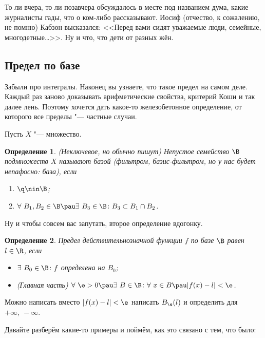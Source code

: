 \documentclass[a4paper,10pt,twoside]{article}
\newtheorem{Def}{Определение}[section]
\begin{document}
 То ли вчера, то ли позавчера обсуждалось в месте под названием дума, какие журналисты гады, что о ком-либо рассказывают. Иосиф (отчество, к сожалению, не помню)
 Кабзон высказался: <<Перед вами сидят уважаемые люди, семейные, многодетные\ldots>>. Ну и что, что дети от разных жён.
 
 \subsection{Предел по базе}
 Забыли про интегралы. Наконец вы узнаете, что такое предел на самом деле. Каждый раз заново доказывать арифметические свойства, критерий Коши и так далее лень.
 Поэтому хочется дать какое-то железобетонное определение, от которого все пределы "--- частные случаи.
 
 Пусть $X$ "--- множество.
 
 \begin{Def}(Неключевое, но обычно пишут)
 	Непустое семейство $\B$ подмножеств $X$ называют базой (фильтром, базис-фильтром, но у нас будет непафосно: база), если
 	\begin{enumerate}
 	  \item $\q\nin \B$;
 	  \item $\forall\  B_1,B_2\in\B\pau \exists\  B_3\in\B\colon B_3\subset B_1\cap B_2$.
 	\end{enumerate}
 \end{Def} 
 
 Ну и чтобы совсем вас запутать, второе определение вдогонку.
 
 \begin{Def}
 	Предел действительнозначной функции $f$  по базе $\B$ равен $l\in\R$, если
 	\begin{itemize}
 	  \item [0)] $\exists\  B_0\in\B\colon f$ определена на $B_0$;
 	  \item [1)] (Главная часть) $\forall\  \e>0\pau \exists\  B\in\B\colon \forall\  x\in B\pau |f(x)-l|<\e$.
 	\end{itemize}
 \end{Def}
 
 Можно написать вместо $|f(x)-l|<\e$ написать $B_\e(l)$ и определить для $+\infty,\ -\infty$.
 
 Давайте разберём какие-то примеры и поймём, как это связано с тем, что было:
 
\end{document}
